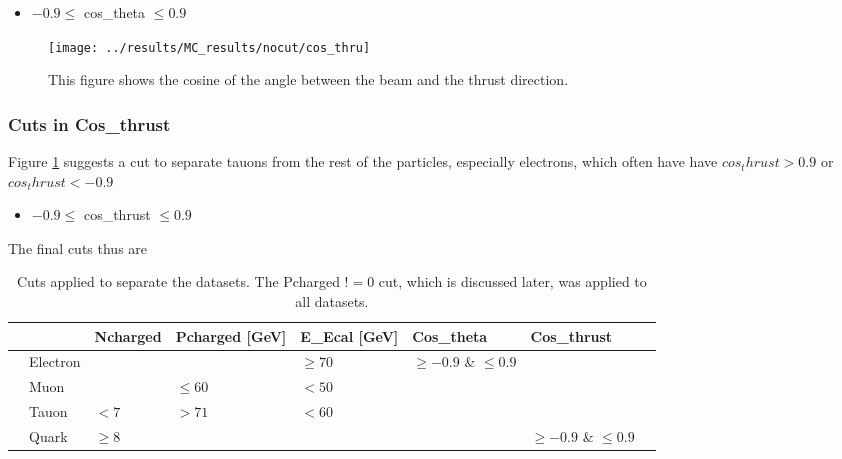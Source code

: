 \begin{itemize}
	\item{ $-0.9\le$ cos\_theta $\le0.9$}
\end{itemize}

\newpage
\begin{figure}[h]
\centering
\texttt{[image: ../results/MC\_results/nocut/cos\_thru]}
\caption[Cos\_thru in simulation data]{This figure shows the cosine of the angle between the beam and the thrust direction.}
\label{fig:cos_thru}
\end{figure}

\subsubsection{Cuts in Cos\_thrust}
Figure \ref{fig:cos_thru} suggests a cut to separate tauons from the rest of the particles, especially electrons, which often have have $cos_thrust>0.9$ or $cos_thrust<-0.9$

\begin{itemize}
	\item{ $-0.9\le$ cos\_thrust $\le0.9$}
\end{itemize}

The final cuts thus are
\begin{table}[H]\centering
	\begin{tabular}{@{}llllllll@{}}
		\toprule
		&			&Ncharged	&Pcharged [GeV]	&E\_Ecal [GeV] &Cos\_theta				&Cos\_thrust\\ 
		\midrule
		&Electron	&			&				&$\ge70$		&$\ge-0.9$ \& $\le0.9$	&\\
		&Muon		&			&$\le60$		&$<50$			&						&\\
		&Tauon		&$<7$		&$>71$			&$<60$			&						&\\
		&Quark		&$\ge8$		&				&				&						&$\ge-0.9$ \& $\le0.9$	\\
		\bottomrule
	\end{tabular}
	\caption[Table of cuts]{Cuts applied to separate the datasets. The Pcharged $!=0$ cut, which is discussed later, was applied to all datasets.}
\end{table}
\newpage

